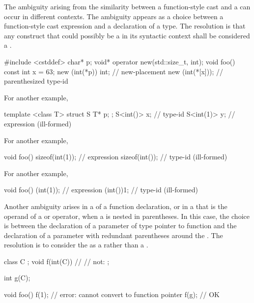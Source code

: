 \pnum
The ambiguity arising from the similarity between a function-style
cast and a
can occur in different contexts.
The ambiguity appears as a choice between a function-style cast
expression and a declaration of a type.
The resolution is that any construct that could possibly be a
in its syntactic context shall be considered a
.

\pnum
\enterexample

\begin{codeblock}
#include <cstddef>
char* p;
void* operator new(std::size_t, int);
void foo()  {
  const int x = 63;
  new (int(*p)) int;            // new-placement
  new (int(*[x]));              // parenthesized type-id
}
\end{codeblock}

\pnum
For another example,

\begin{codeblock}
template <class T>
struct S {
  T* p;
};
S<int()> x;                     // type-id
S<int(1)> y;                    // expression (ill-formed)
\end{codeblock}

\pnum
For another example,

\begin{codeblock}
void foo() {
  sizeof(int(1));               // expression
  sizeof(int());                // type-id (ill-formed)
}
\end{codeblock}

\pnum
For another example,

\begin{codeblock}
void foo() {
  (int(1));                     // expression
  (int())1;                     // type-id (ill-formed)
}
\end{codeblock}
\exitexample

\pnum
Another ambiguity arises in a
of a function declaration, or in a
that is the operand of a
or
operator, when a
is nested in parentheses.
In this case, the choice is between the declaration of a parameter of type
pointer to function and the declaration of a parameter with redundant
parentheses around the
.
The resolution is to consider the
as a
rather than a
.
\enterexample

\begin{codeblock}
class C { };
void f(int(C)) { }              // 
                                // not: ;

int g(C);

void foo() {
  f(1);                         // error: cannot convert  to function pointer
  f(g);                         // OK
}
\end{codeblock}

